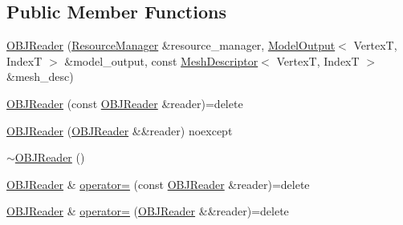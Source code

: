\subsection*{Public Member Functions}
\begin{DoxyCompactItemize}
\item 
\hyperlink{classmage_1_1rendering_1_1loader_1_1_o_b_j_reader_a5fe68a545e05c266b69f35e4dc9027a9}{O\+B\+J\+Reader} (\hyperlink{classmage_1_1rendering_1_1_resource_manager}{Resource\+Manager} \&resource\+\_\+manager, \hyperlink{structmage_1_1rendering_1_1_model_output}{Model\+Output}$<$ VertexT, IndexT $>$ \&model\+\_\+output, const \hyperlink{classmage_1_1rendering_1_1_mesh_descriptor}{Mesh\+Descriptor}$<$ VertexT, IndexT $>$ \&mesh\+\_\+desc)
\item 
\hyperlink{classmage_1_1rendering_1_1loader_1_1_o_b_j_reader_a1ba7402bf27180682de9109a3d0d031f}{O\+B\+J\+Reader} (const \hyperlink{classmage_1_1rendering_1_1loader_1_1_o_b_j_reader}{O\+B\+J\+Reader} \&reader)=delete
\item 
\hyperlink{classmage_1_1rendering_1_1loader_1_1_o_b_j_reader_afa0ab677916b17126aa4fc202c52684e}{O\+B\+J\+Reader} (\hyperlink{classmage_1_1rendering_1_1loader_1_1_o_b_j_reader}{O\+B\+J\+Reader} \&\&reader) noexcept
\item 
\hyperlink{classmage_1_1rendering_1_1loader_1_1_o_b_j_reader_a2b10c4cbb4c4aea192c78045beb4735e}{$\sim$\+O\+B\+J\+Reader} ()
\item 
\hyperlink{classmage_1_1rendering_1_1loader_1_1_o_b_j_reader}{O\+B\+J\+Reader} \& \hyperlink{classmage_1_1rendering_1_1loader_1_1_o_b_j_reader_a006549a7f9724580c7fdae2f7a9c7bdf}{operator=} (const \hyperlink{classmage_1_1rendering_1_1loader_1_1_o_b_j_reader}{O\+B\+J\+Reader} \&reader)=delete
\item 
\hyperlink{classmage_1_1rendering_1_1loader_1_1_o_b_j_reader}{O\+B\+J\+Reader} \& \hyperlink{classmage_1_1rendering_1_1loader_1_1_o_b_j_reader_ad35fe46e20179ce1cd79386501ee0959}{operator=} (\hyperlink{classmage_1_1rendering_1_1loader_1_1_o_b_j_reader}{O\+B\+J\+Reader} \&\&reader)=delete
\end{DoxyCompactItemize}
